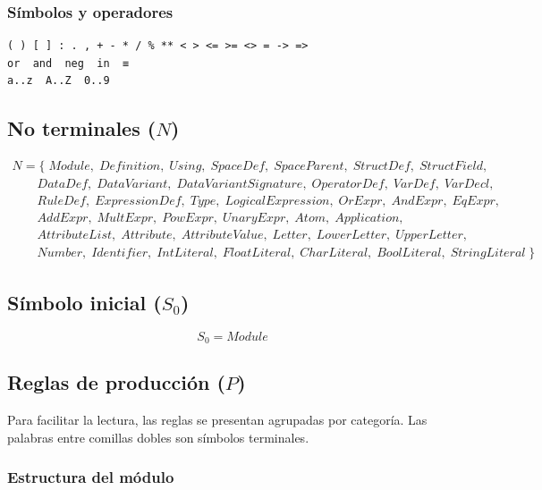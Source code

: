 \documentclass[12pt]{article}
\begin{document}
\subsubsection{Símbolos y operadores}

\begin{lstlisting}[style=rascalstyle, basicstyle=\ttfamily\small]
( ) [ ] : . , + - * / % ** < > <= >= <> = -> =>
or  and  neg  in  ≡
a..z  A..Z  0..9
\end{lstlisting}

\subsection{No terminales ($N$)}

\small
\[
\begin{array}{l}
N = \{\;Module,\;Definition,\;Using,\;SpaceDef,\;SpaceParent,\;StructDef,\;
StructField,\;\\
\qquad DataDef,\;DataVariant,\;DataVariantSignature,\;OperatorDef,\;VarDef,\;
VarDecl,\;\\
\qquad RuleDef,\;ExpressionDef,\;Type,\;LogicalExpression,\;OrExpr,\;AndExpr,\;
EqExpr,\;\\
\qquad AddExpr,\;MultExpr,\;PowExpr,\;UnaryExpr,\;Atom,\;Application,\;\\
\qquad AttributeList,\;Attribute,\;AttributeValue,\;Letter,\;LowerLetter,\;
UpperLetter,\;\\
\qquad Number,\;Identifier,\;IntLiteral,\;FloatLiteral,\;CharLiteral,\;
BoolLiteral,\;StringLiteral\;\}
\end{array}
\]
\normalsize

\subsection{Símbolo inicial ($S_0$)}

\[ S_0 = Module \]

\subsection{Reglas de producción ($P$)}

Para facilitar la lectura, las reglas se presentan agrupadas por categoría. Las
palabras entre comillas dobles son símbolos terminales.

\subsubsection*{Estructura del módulo}
\end{document}
